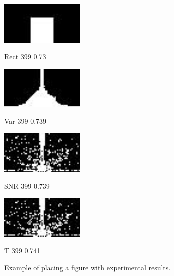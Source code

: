 \documentclass{article}
\begin{document}
\begin{figure}[htb]

\begin{minipage}[b]{.48\linewidth}
  \centering
  \centerline{\includegraphics[width=4.0cm]{filter/rectF_399}}
  \centerline{Rect 399 0.73}\medskip
\end{minipage}
\hfill
\begin{minipage}[b]{0.48\linewidth}
  \centering
  \centerline{\includegraphics[width=4.0cm]{filter/varF_399}}
  \centerline{Var 399 0.739}\medskip
\end{minipage}
%
\begin{minipage}[b]{.48\linewidth}
  \centering
  \centerline{\includegraphics[width=4.0cm]{filter/snrF_399}}
  \centerline{SNR 399 0.739}\medskip
\end{minipage}
\hfill
\begin{minipage}[b]{0.48\linewidth}
  \centering
  \centerline{\includegraphics[width=4.0cm]{filter/tF_399}}
  \centerline{T 399 0.741}\medskip
\end{minipage}
%
\caption{Example of placing a figure with experimental results.}
\label{fig:res}
%
\end{figure}
\end{document}
